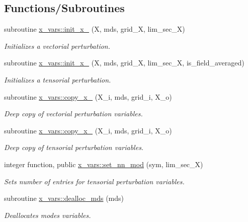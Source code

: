 \subsection*{Functions/\+Subroutines}
\begin{DoxyCompactItemize}
\item 
subroutine \hyperlink{namespacex__vars_a327c74a0fa8c50aa2ed812062bd82436}{x\+\_\+vars\+::init\+\_\+x\+\_} (X, mds, grid\+\_\+X, lim\+\_\+sec\+\_\+X)
\begin{DoxyCompactList}\small\item\em Initializes a vectorial perturbation. \end{DoxyCompactList}\item 
subroutine \hyperlink{namespacex__vars_a5cb61bfd7fbdae7bae2ec10b63160d74}{x\+\_\+vars\+::init\+\_\+x\+\_} (X, mds, grid\+\_\+X, lim\+\_\+sec\+\_\+X, is\+\_\+field\+\_\+averaged)
\begin{DoxyCompactList}\small\item\em Initializes a tensorial perturbation. \end{DoxyCompactList}\item 
subroutine \hyperlink{namespacex__vars_ae9744cbf1a4fc06080517a03ac43b960}{x\+\_\+vars\+::copy\+\_\+x\+\_} (X\+\_\+i, mds, grid\+\_\+i, X\+\_\+o)
\begin{DoxyCompactList}\small\item\em Deep copy of vectorial perturbation variables. \end{DoxyCompactList}\item 
subroutine \hyperlink{namespacex__vars_aeaa25b69e4ef9cc5882c9dcf894201d7}{x\+\_\+vars\+::copy\+\_\+x\+\_} (X\+\_\+i, mds, grid\+\_\+i, X\+\_\+o)
\begin{DoxyCompactList}\small\item\em Deep copy of tensorial perturbation variables. \end{DoxyCompactList}\item 
integer function, public \hyperlink{namespacex__vars_a90d744aee4358a8cc35d29304d1bb120}{x\+\_\+vars\+::set\+\_\+nn\+\_\+mod} (sym, lim\+\_\+sec\+\_\+X)
\begin{DoxyCompactList}\small\item\em Sets number of entries for tensorial perturbation variables. \end{DoxyCompactList}\item 
subroutine \hyperlink{namespacex__vars_a4a7e4b95bbcb90e8afb4985fc9456e67}{x\+\_\+vars\+::dealloc\+\_\+mds} (mds)
\begin{DoxyCompactList}\small\item\em Deallocates modes variables. \end{DoxyCompactList}\item 

\end{DoxyCompactItemize}
